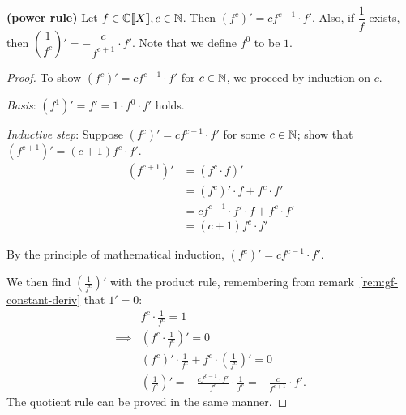 \documentclass[a4paper, 12pt]{report}
\begin{document}
\begin{lem}\label{lem:gf-power-rule}
\textbf{(power rule)} Let $f \in \mathbb{C}\llbracket X \rrbracket, c \in \mathbb{N}$. Then $(f^c)'  = c f^{c - 1} \cdot f'$. Also, if $\dfrac{1}{f}$ exists, then $\left(\dfrac{1}{f^c}\right)' = -\dfrac{c}{f^{c + 1}} \cdot f'$. Note that we define $f^0$ to be $1$.
\end{lem}
\begin{proof}
To show $(f^c)' = c f^{c - 1} \cdot f'$ for $c \in \mathbb{N}$, we proceed by induction on $c$.
\begin{description}
\item \textit{Basis}: $(f^1)' = f' = 1 \cdot f^0 \cdot f'$ holds.
\item \textit{Inductive step}: Suppose $(f^c)' = c f^{c - 1} \cdot f'$ for some $c \in \mathbb{N}$; show that $(f^{c + 1})' = (c + 1) f^c \cdot f'$.
\begin{align*}
    (f^{c + 1})'
    &= (f^c \cdot f)'\\
    &= (f^c)' \cdot f + f^c \cdot f'\\
    &= c f^{c - 1} \cdot f' \cdot f + f^c \cdot f'\\
    &= (c + 1) f^c \cdot f'
\end{align*}
\item By the principle of mathematical induction, $(f^c)' = c f^{c - 1} \cdot f'$.
\end{description}

We then find $(\frac{1}{f^c})'$ with the product rule, remembering from remark~\ref{rem:gf-constant-deriv} that $1' = 0$:
\begin{align*}
    &f^c \cdot \frac{1}{f^c} = 1\\
    \implies &(f^c \cdot \frac{1}{f^c})' = 0\\
    &(f^c)' \cdot \frac{1}{f^c} + f^c \cdot \left(\frac{1}{f^c}\right)' = 0\\
    &\left(\frac{1}{f^c}\right)'= -\frac{c f^{c - 1} \cdot f'}{f^c} \cdot \frac{1}{f^c} = -\frac{c}{f^{c + 1}} \cdot f'.
\end{align*}
The quotient rule can be proved in the same manner.
\end{proof}
\end{document}
